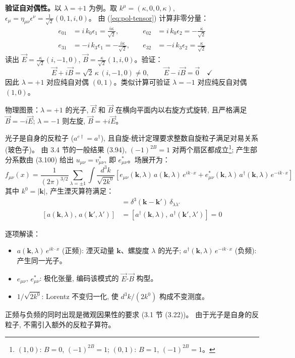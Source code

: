 \textbf{验证自对偶性。}以 $\lambda=+1$ 为例。取 $k^\mu=(\kappa,0,0,\kappa)$,
$\epsilon_\mu = \eta_{\mu\nu}\epsilon^\nu = \frac{1}{\sqrt{2}}(0,1,i,0)$。
由 (\ref{eq:pol-tensor}) 计算非零分量：
\begin{align}
    e_{01} &= i\,k_0\epsilon_1 = \frac{i\kappa}{\sqrt{2}}, &\quad
    e_{02} &= i\,k_0\epsilon_2 = -\frac{\kappa}{\sqrt{2}} \\
    e_{31} &= -i\,k_3\epsilon_1 = -\frac{i\kappa}{\sqrt{2}}, &\quad
    e_{32} &= -i\,k_3\epsilon_2 = \frac{\kappa}{\sqrt{2}}
\end{align}
读出 $\vec{E}=\frac{\kappa}{\sqrt{2}}(i,-1,0)$,
$\vec{B}=\frac{\kappa}{\sqrt{2}}(1,i,0)$。验证：
\begin{equation}
    \vec{E}+i\vec{B} = \sqrt{2}\,\kappa\,(i,-1,0) \neq 0, \qquad
    \vec{E}-i\vec{B} = \vec{0} \quad\checkmark
\end{equation}
因此 $\lambda=+1$ 对应纯自对偶 $(0,1)$。类似计算可验证 $\lambda=-1$ 对应纯反自对偶 $(1,0)$。

物理图景：$\lambda=+1$ 的光子, $\vec{E}$ 和 $\vec{B}$ 在横向平面内以右旋方式旋转,
且严格满足 $\vec{B}=-i\vec{E}$; $\lambda=-1$ 则左旋, $\vec{B}=+i\vec{E}$。



光子是自身的反粒子 ($a^{c\dagger}=a^\dagger$),
且自旋-统计定理要求整数自旋粒子满足对易关系 (玻色子)。
由 3.4 节的一般结果 (3.94), $(-1)^{2B}=1$ 对两个扇区都成立\footnote{%
$(1,0)$: $B=0$, $(-1)^{2B}=1$; $(0,1)$: $B=1$, $(-1)^{2B}=1$。};
产生部分系数由 (3.100) 给出 $u_{\mu\nu}=v_{\mu\nu}^*$, 即 $e^*_{\mu\nu}$。场展开为：
\begin{equation}
    \boxed{
    f_{\mu\nu}(x) = \frac{1}{(2\pi)^{3/2}} \sum_{\lambda=\pm 1} \int \frac{d^3k}{\sqrt{2k^0}}
    \left[e_{\mu\nu}(\mathbf{k},\lambda)\,a(\mathbf{k},\lambda)\,e^{ik\cdot x}
    + e^*_{\mu\nu}(\mathbf{k},\lambda)\,a^\dagger(\mathbf{k},\lambda)\,e^{-ik\cdot x}\right]
    }
    \label{eq:f-expansion}
\end{equation}
其中 $k^0=|\mathbf{k}|$, 产生湮灭算符满足：
\begin{align}
    [a(\mathbf{k},\lambda),\,a^\dagger(\mathbf{k}',\lambda')] &= \delta^3(\mathbf{k}-\mathbf{k}')\,
    \delta_{\lambda\lambda'} \label{eq:photon-commutation} \\
    [a(\mathbf{k},\lambda),\,a(\mathbf{k}',\lambda')] &=
    [a^\dagger(\mathbf{k},\lambda),\,a^\dagger(\mathbf{k}',\lambda')] = 0
\end{align}

逐项解读：
\begin{itemize}
    \item $a(\mathbf{k},\lambda)\,e^{ik\cdot x}$ (正频): 湮灭动量 $\mathbf{k}$、螺旋度 $\lambda$ 的光子;
    $a^\dagger(\mathbf{k},\lambda)\,e^{-ik\cdot x}$ (负频): 产生同一光子。
    \item $e_{\mu\nu}$, $e^*_{\mu\nu}$: 极化张量, 编码该模式的 $\vec{E}$-$\vec{B}$ 构型。
    \item $1/\sqrt{2k^0}$: Lorentz 不变归一化, 使 $d^3k/(2k^0)$ 构成不变测度。
\end{itemize}
正频与负频的同时出现是微观因果性的要求 (3.1 节 (3.22))。
由于光子是自身的反粒子, 不需引入额外的反粒子算符。

